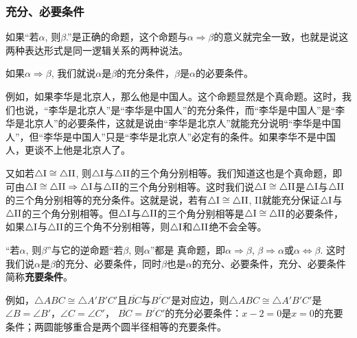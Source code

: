 \subsubsection{充分、必要条件}

如果“若$\alpha$, 则$\beta$.”是正确的命题，这个命题与$\alpha\Rightarrow\beta$的意义就完全一致，也就是说这两种表达形式是同一逻辑关系的两种说法。

\begin{blk}{}
	如果$\alpha\Rightarrow\beta$, 我们就说$\alpha$是$\beta$的充分条件，$\beta$是$\alpha$的必要条件。  
\end{blk}

例如，如果李华是北京人，那么他是中国人。这个命题显然是个真命题。这时，我们也说，“李华是北京人”是“李华是中国人”的充分条件，而“李华是中国人”是“李华是北京人”的必要条件，这就是说由“李华是北京人”就能充分说明“李华是中国人”，但“李华是中国人”只是“李华是北京人”必定有的条件。如果李华不是中国人，更谈不上他是北京人了。

又如若$\triangle {\rm I}\cong \triangle {\rm II}$, 则$\triangle {\rm I}$与$\triangle {\rm II}$的三个角分别相等。我们知道这也是个真命题，即可由$\triangle {\rm I}\cong \triangle {\rm II}\Rightarrow \triangle {\rm I}$与$\triangle {\rm II}$的三个角分别相等。这时我们说$\triangle {\rm I}\cong \triangle {\rm II}$是$\triangle {\rm I}$与$\triangle {\rm II}$的三个角分别相等的充分条件。这就是说，若有$\triangle {\rm I}\cong\triangle {\rm II}$, II就能充分保证$\triangle {\rm I}$与$\triangle {\rm II}$的三个角分别相等。但$\triangle {\rm I}$与$\triangle {\rm II}$的三个角分别相等是$\triangle {\rm I}\cong \triangle {\rm II}$的必要条件，如果$\triangle {\rm I}$与$\triangle {\rm II}$的三个角不分别相等，则$\triangle {\rm I}$和$\triangle {\rm II}$绝不会全等。

“若$\alpha$, 则$\beta$”与它的逆命题“若$\beta$, 则$\alpha$”都是
真命题，即$\alpha\Rightarrow\beta$, $\beta\Rightarrow\alpha$或$\alpha\Leftrightarrow\beta$. 这时我们说$\alpha$是$\beta$的充分、必要条件，同时$\beta$也是$\alpha$的充分、必要条件，充分、必要条件简称\textbf{充要条件}。

例如，$\triangle ABC\cong \triangle A'B'C'$且$\overline{BC}$与$\overline{B'C'}$是对应边，则$\triangle ABC\cong \triangle A'B'C'$是
$\angle B=\angle B'$，$\angle C=\angle C'$，
$\overline{BC}=\overline{B'C'}$的充分必要条件：$x-2=0$是$x=0$的充要条件；两圆能够重合是两个圆半径相等的充要条件。

